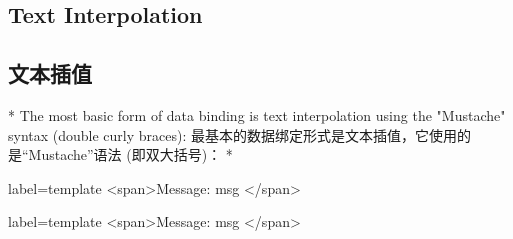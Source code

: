 \begin{paracol}{2}
\subsection{Text Interpolation}
\switchcolumn
\subsection{文本插值}
\switchcolumn[0]*%
The most basic form of data binding is text interpolation using the
"Mustache" syntax (double curly braces):
\switchcolumn
最基本的数据绑定形式是文本插值，它使用的是``Mustache''语法
(即双大括号)：
\switchcolumn[0]*%
\begin{codeHtml*}{label=template}
<span>Message: {{ msg }}</span>
\end{codeHtml*}  
\switchcolumn
\begin{codeHtml*}{label=template}
<span>Message: {{ msg }}</span>
\end{codeHtml*}  
\end{paracol}
